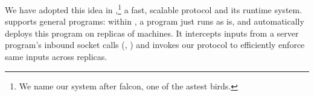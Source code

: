 % 
% 
% 

We have adopted this idea in \xxx,\footnote{We name our system after 
falcon, one of the astest birds.} a fast, scalable \paxos protocol and its 
runtime system. \xxx supports general programs: within \xxx, a program just 
runs as is, and \xxx automatically deploys this program on replicas of machines. 
It intercepts inputs from a server program's inbound socket calls (\eg, \recv) 
and invokes our \paxos protocol to efficiently enforce same inputs across 
replicas.

